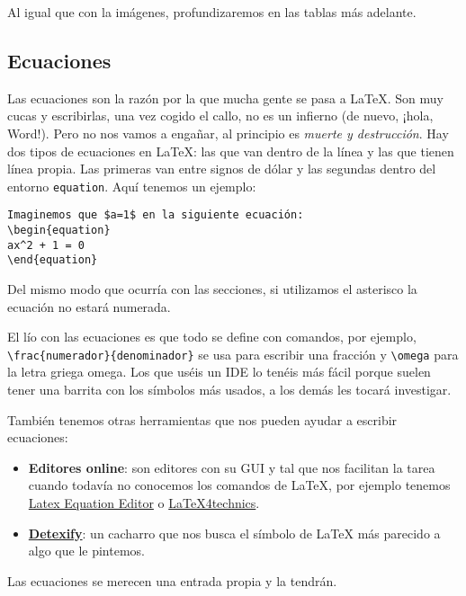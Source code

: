 Al igual que con la imágenes, profundizaremos en las tablas más
adelante.

\subsection{Ecuaciones}\label{ecuaciones}

Las ecuaciones son la razón por la que mucha gente se pasa a LaTeX. Son
muy cucas y escribirlas, una vez cogido el callo, no es un infierno (de
nuevo, ¡hola, Word!). Pero no nos vamos a engañar, al principio es
\emph{muerte y destrucción}. Hay dos tipos de ecuaciones en LaTeX: las
que van dentro de la línea y las que tienen línea propia. Las primeras
van entre signos de dólar y las segundas dentro del entorno
\lstinline!equation!. Aquí tenemos un ejemplo:

\begin{lstlisting}
Imaginemos que $a=1$ en la siguiente ecuación:
\begin{equation}
ax^2 + 1 = 0
\end{equation}
\end{lstlisting}

Del mismo modo que ocurría con las secciones, si utilizamos el asterisco
la ecuación no estará numerada.

El lío con las ecuaciones es que todo se define con comandos, por
ejemplo, \lstinline!\frac{numerador}{denominador}! se usa para escribir
una fracción y \lstinline!\omega! para la letra griega omega. Los que
uséis un IDE lo tenéis más fácil porque suelen tener una barrita con los
símbolos más usados, a los demás les tocará investigar.

También tenemos otras herramientas que nos pueden ayudar a escribir
ecuaciones:

\begin{itemize}
\item
  \textbf{Editores online}: son editores con su GUI y tal que nos
  facilitan la tarea cuando todavía no conocemos los comandos de LaTeX,
  por ejemplo tenemos
  \href{http://www.numberempire.com/texequationeditor/equationeditor.php\%22}{Latex
  Equation Editor} o
  \href{https://www.latex4technics.com/}{LaTeX4technics}.
\item
  \href{http://detexify.kirelabs.org/classify.html}{\textbf{Detexify}}:
  un cacharro que nos busca el símbolo de LaTeX más parecido a algo que
  le pintemos.
\end{itemize}

Las ecuaciones se merecen una entrada propia y la tendrán.

